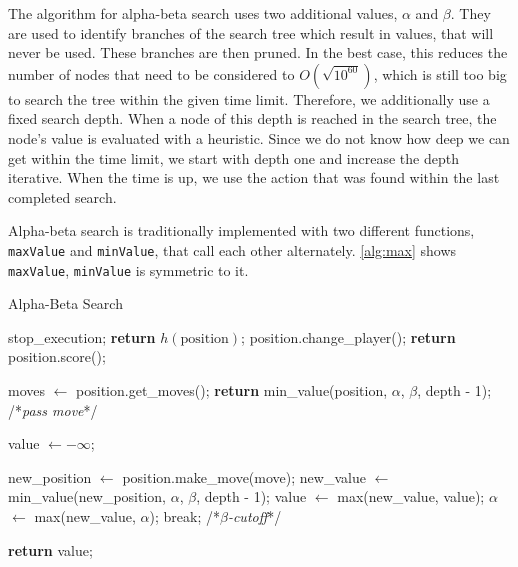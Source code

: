 The algorithm for alpha-beta search uses two additional values, $\alpha$ and $\beta$.
They are used to identify branches of the search tree which result in values, that will never be used.
These branches are then pruned.
In the best case, this reduces the number of nodes that need to be considered to $O(\sqrt{10^{60}})$, which is still too big to search the tree within the given time limit.
Therefore, we additionally use a fixed search depth.
When a node of this depth is reached in the search tree, the node's value is evaluated with a heuristic.
Since we do not know how deep we can get within the time limit, we start with depth one and increase the depth iterative.
When the time is up, we use the action that was found within the last completed search.

Alpha-beta search is traditionally implemented with two different functions, \texttt{maxValue} and \texttt{minValue}, that call each other alternately.
\cref{alg:max} shows \texttt{maxValue}, \texttt{minValue} is symmetric to it.

\begin{algorithm}[H]
    \caption{Alpha-Beta Search}
    \label{alg:max}
    \begin{algorithmic}[1]
                \State stop\_execution;
            \EndIf
                \State \textbf{return} $h(\text{position})$;
            \EndIf
                \State position.change\_player();
                \State \textbf{return} position.score();
            \EndIf
            \State
            
            \State moves $\leftarrow$ position.get\_moves();
                \State \textbf{return} min\_value(position, $\alpha$, $\beta$, depth - 1); /*\emph{pass move}*/
            \EndIf

            \State value $\leftarrow -\infty$;
            
                \State new\_position $\leftarrow$ position.make\_move(move);
                \State new\_value $\leftarrow$ min\_value(new\_position, $\alpha$, $\beta$, depth - 1);
                \State value $\leftarrow$ max(new\_value, value);
                \State $\alpha$ $\leftarrow$ max(new\_value, $\alpha$);
                \If{$\alpha$ $\geq$ $\beta$}
                    \State break; /*\emph{$\beta$-cutoff}*/
                \EndIf

            \EndFor 
            
            \State \textbf{return} value;
        \EndFunction
    \end{algorithmic}
\end{algorithm}


